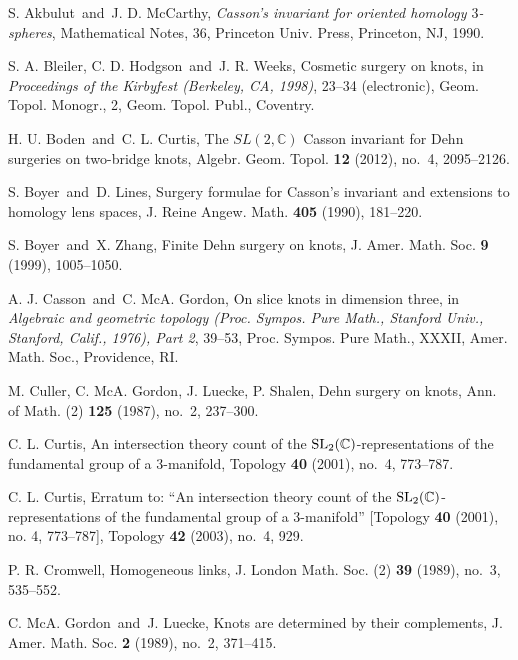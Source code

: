 \documentclass{amsart}
\theoremstyle{remark}
\theoremstyle{definition}
\begin{document}
\begin{thebibliography}{99}

S. Akbulut\ and\ J. D. McCarthy, 
{\it Casson's invariant for oriented homology $3$-spheres}, 
Mathematical Notes, 36, Princeton Univ. Press, Princeton, NJ, 1990. 

S. A. Bleiler, C. D. Hodgson\ and\ J. R. Weeks, 
Cosmetic surgery on knots, 
in {\it Proceedings of the Kirbyfest (Berkeley, CA, 1998)}, 23--34 (electronic), 
Geom. Topol. Monogr., 2, Geom. Topol. Publ., Coventry. 

H. U. Boden\ and\ C. L. Curtis, 
The $SL(2,\mathbb{C})$ Casson invariant for Dehn surgeries on two-bridge knots, 
Algebr. Geom. Topol. {\bf 12} (2012), no.~4, 2095--2126. 

S. Boyer\ and\ D. Lines, 
Surgery formulae for Casson's invariant and extensions to homology lens spaces, 
J. Reine Angew. Math. {\bf 405} (1990), 181--220.

S. Boyer\ and\ X. Zhang, 
Finite Dehn surgery on knots, 
J. Amer. Math. Soc. {\bf 9} (1999), 1005--1050.



A. J. Casson\ and\ C. McA. Gordon, 
On slice knots in dimension three, 
in {\it Algebraic and geometric topology (Proc. Sympos. Pure Math., Stanford Univ., Stanford, Calif., 1976), Part 2}, 39--53, 
Proc. Sympos. Pure Math., XXXII, Amer. Math. Soc., Providence, RI. 

M. Culler, C. McA. Gordon, J. Luecke, P. Shalen, 
Dehn surgery on knots, 
Ann. of Math. (2) {\bf 125} (1987), no.~2, 237--300. 

C. L. Curtis, 
An intersection theory count of the ${\rm SL}\sb 2(\mathbb{C})$-representations of the fundamental group of a $3$-manifold, 
Topology {\bf 40} (2001), no.~4, 773--787. 

C. L. Curtis, 
Erratum to: ``An intersection theory count of the ${\rm SL}\sb 2({\Bbb C})$-representations of the fundamental group of a 3-manifold'' [Topology {\bf 40} (2001), no. 4, 773--787], 
Topology {\bf 42} (2003), no.~4, 929. 

P. R. Cromwell, 
Homogeneous links, 
J. London Math. Soc. (2) {\bf 39} (1989), no.~3, 535--552. 


C. McA. Gordon\ and\ J. Luecke, 
Knots are determined by their complements, 
J. Amer. Math. Soc. {\bf 2} (1989), no.~2, 371--415.


\end{thebibliography}
\end{document}
